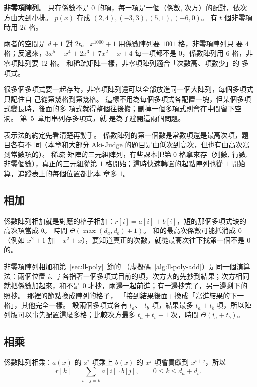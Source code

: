 \textbf{非零項陣列}。 只存係數不是 $0$ 的項，每一項是一個（係數, 次方）的配對，依次
方由大到小排。 $p(x)$ 存成 $(2, 4), (-3, 3), (5, 1), (-6, 0)$。 有 $t$ 個非零項時用
$2t$ 格。

兩者的空間是 $d + 1$ 對 $2t$。 $x^{1000} + 1$ 用係數陣列要 $1001$ 格，非零項陣列只
要 $4$ 格；反過來，$3x^5 - x^4 + 2x^3 + 7x^2 - x + 4$ 每一項都不是 $0$，係數陣列用
$6$ 格，非零項陣列要 $12$ 格。 和稀疏矩陣一樣，非零項陣列適合「次數高、項數少」的
多項式。

很多個多項式要一起存時，非零項陣列還可以全部放進同一個大陣列，每個多項式只記住自
己從第幾格到第幾格。 這樣不用為每個多項式各配置一塊，但某個多項式變長時，後面的多
項式就得整個往後搬；刪掉一個多項式則會在中間留下空洞。 第~5~章用串列存多項式，就
是為了避開這兩個問題。

\begin{examnote}
表示法的約定先看清楚再動手。 係數陣列的第一個數是常數項還是最高次項，題目各有不
同（本章和大部分 Aki-Judge 的題目是由低次到高次，但也有由高次寫到常數項的）。 稀疏
矩陣的三元組陣列，有些課本把第 $0$ 格拿來存（列數, 行數, 非零個數），真正的三元組從第 $1$
格開始；這時快速轉置的起點陣列也從 $1$ 開始算，追蹤表上的每個位置都比本
章多 $1$。
\end{examnote}

\subsection{相加}

係數陣列相加就是對應的格子相加：$r[i] = a[i] + b[i]$，短的那個多項式缺的高次項當成
$0$。 時間 $\Theta(\max(d_a, d_b) + 1)$。 和的最高次係數可能抵消成 $0$（例如
$x^2 + 1$ 加 $-x^2 + x$），要知道真正的次數，就從最高次往下找第一個不是 $0$ 的。

非零項陣列相加和第~\ref{sec:ll-poly}~節的 （虛擬碼~\ref{alg:ll-poly-add}）是同一個演算法：兩個位置 $i$、$j$
各指著一個多項式目前的項，次方大的先抄到結果；次方相同就把係數加起來，和不是 $0$
才抄，兩邊一起前進；有一邊抄完了，另一邊剩下的照抄。 那裡的節點換成陣列的格子，
「接到結果後面」換成「寫進結果的下一格」，其他完全一樣。 設兩個多項式各有 $t_a$、
$t_b$ 項，結果最多 $t_a + t_b$ 項，所以陣列版可以事先配置這麼多格；比較次方最多
$t_a + t_b - 1$ 次，時間 $\Theta(t_a + t_b)$。

\subsection{相乘}

係數陣列相乘：$a(x)$ 的 $x^i$ 項乘上 $b(x)$ 的 $x^j$ 項會貢獻到 $x^{i+j}$，所以
\[
r[k] = \sum_{i + j = k} a[i] \cdot b[j], \qquad 0 \le k \le d_a + d_b .
\]

